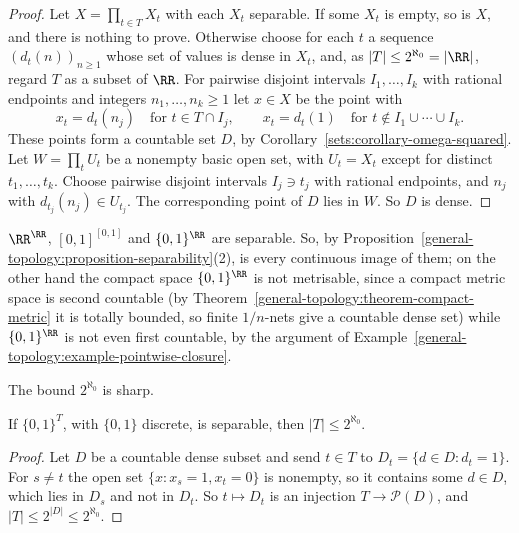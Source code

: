 \begin{proof}
Let $X = \prod_{t \in T}X_t$ with each $X_t$ separable. If some $X_t$ is empty, so is $X$, and there is nothing to prove. Otherwise choose for each $t$ a sequence $(d_t(n))_{n \geq 1}$ whose set of values is dense in
$X_t$, and, as $|T| \leq 2^{\aleph_0} = |\RR|$, regard $T$ as a subset of $\RR$. For pairwise disjoint intervals $I_1, \ldots, I_k$ with rational endpoints and integers $n_1, \ldots, n_k \geq 1$ let $x \in X$ be the point with
\[
x_t = d_t(n_j) \quad \text{for } t \in T \cap I_j, \qquad x_t = d_t(1) \quad \text{for } t \notin I_1 \cup \cdots \cup I_k .
\]
These points form a countable set $D$, by Corollary~\ref{sets:corollary-omega-squared}. Let $W = \prod_tU_t$ be a nonempty basic open set, with $U_t = X_t$ except for distinct $t_1, \ldots, t_k$. Choose
pairwise disjoint intervals $I_j \ni t_j$ with rational endpoints, and $n_j$ with $d_{t_j}(n_j) \in U_{t_j}$. The corresponding point of $D$ lies in $W$. So $D$ is dense.
\end{proof}

\begin{example}\label{general-topology:example-hmp}
$\RR^\RR$, $[0, 1]^{[0, 1]}$ and $\{0, 1\}^\RR$ are separable. So, by Proposition~\ref{general-topology:proposition-separability}(2), is every continuous image of them; on the other hand the compact space
$\{0, 1\}^\RR$ is not metrisable, since a compact metric space is second countable (by Theorem~\ref{general-topology:theorem-compact-metric} it is totally bounded, so finite $1/n$-nets give a countable dense set)
while $\{0, 1\}^\RR$ is not even first countable, by the argument of Example~\ref{general-topology:example-pointwise-closure}.
\end{example}

The bound $2^{\aleph_0}$ is sharp.

\begin{proposition}\label{general-topology:proposition-hmp-sharp}
If $\{0, 1\}^T$, with $\{0, 1\}$ discrete, is separable, then $|T| \leq 2^{\aleph_0}$.
\end{proposition}

\begin{proof}
Let $D$ be a countable dense subset and send $t \in T$ to $D_t = \{d \in D : d_t = 1\}$. For $s \neq t$ the open set $\{x : x_s = 1, x_t = 0\}$ is nonempty, so it contains some $d \in D$, which lies in $D_s$ and not in
$D_t$. So $t \mapsto D_t$ is an injection $T \to \mathcal{P}(D)$, and $|T| \leq 2^{|D|} \leq 2^{\aleph_0}$.
\end{proof}

